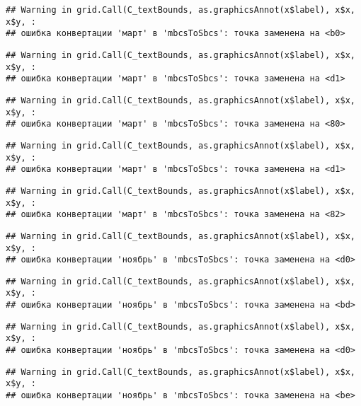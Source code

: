 \documentclass[
]{article}
\begin{document}
\begin{verbatim}
## Warning in grid.Call(C_textBounds, as.graphicsAnnot(x$label), x$x, x$y, :
## ошибка конвертации 'март' в 'mbcsToSbcs': точка заменена на <b0>
\end{verbatim}

\begin{verbatim}
## Warning in grid.Call(C_textBounds, as.graphicsAnnot(x$label), x$x, x$y, :
## ошибка конвертации 'март' в 'mbcsToSbcs': точка заменена на <d1>
\end{verbatim}

\begin{verbatim}
## Warning in grid.Call(C_textBounds, as.graphicsAnnot(x$label), x$x, x$y, :
## ошибка конвертации 'март' в 'mbcsToSbcs': точка заменена на <80>
\end{verbatim}

\begin{verbatim}
## Warning in grid.Call(C_textBounds, as.graphicsAnnot(x$label), x$x, x$y, :
## ошибка конвертации 'март' в 'mbcsToSbcs': точка заменена на <d1>
\end{verbatim}

\begin{verbatim}
## Warning in grid.Call(C_textBounds, as.graphicsAnnot(x$label), x$x, x$y, :
## ошибка конвертации 'март' в 'mbcsToSbcs': точка заменена на <82>
\end{verbatim}

\begin{verbatim}
## Warning in grid.Call(C_textBounds, as.graphicsAnnot(x$label), x$x, x$y, :
## ошибка конвертации 'ноябрь' в 'mbcsToSbcs': точка заменена на <d0>
\end{verbatim}

\begin{verbatim}
## Warning in grid.Call(C_textBounds, as.graphicsAnnot(x$label), x$x, x$y, :
## ошибка конвертации 'ноябрь' в 'mbcsToSbcs': точка заменена на <bd>
\end{verbatim}

\begin{verbatim}
## Warning in grid.Call(C_textBounds, as.graphicsAnnot(x$label), x$x, x$y, :
## ошибка конвертации 'ноябрь' в 'mbcsToSbcs': точка заменена на <d0>
\end{verbatim}

\begin{verbatim}
## Warning in grid.Call(C_textBounds, as.graphicsAnnot(x$label), x$x, x$y, :
## ошибка конвертации 'ноябрь' в 'mbcsToSbcs': точка заменена на <be>
\end{verbatim}
\end{document}
